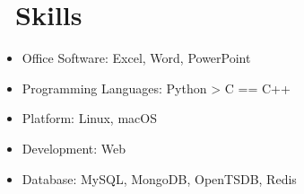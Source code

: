\documentclass{resume}
\begin{document}
\section{\faCogs\ Skills}
\begin{itemize}[parsep=0.5ex]
  \item Office Software: Excel, Word, PowerPoint
  \item Programming Languages: Python > C == C++
  \item Platform: Linux, macOS
  \item Development: Web
  \item Database: MySQL, MongoDB, OpenTSDB, Redis
\end{itemize}


%
%
\end{document}

